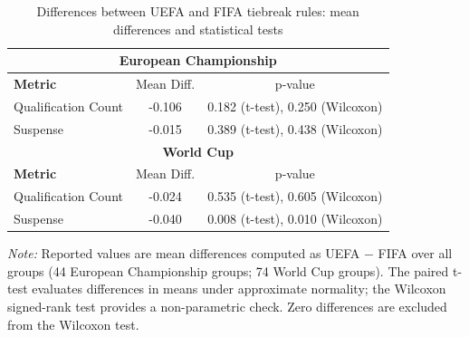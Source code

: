 \begin{table}[H]
\centering
\small
\caption{Differences between UEFA and FIFA tiebreak rules: mean differences and statistical tests}
\label{tab:tests_diff}
\begin{threeparttable}
\begin{tabular}{lcc}
\toprule
\multicolumn{3}{c}{\textbf{European Championship}} \\
\midrule
\textbf{Metric} & Mean Diff. & p-value \\
\midrule
Qualification Count & -0.106 & 0.182 (t-test), 0.250 (Wilcoxon) \\
Suspense            & -0.015 & 0.389 (t-test), 0.438 (Wilcoxon) \\
\midrule
\multicolumn{3}{c}{\textbf{World Cup}} \\
\midrule
\textbf{Metric} & Mean Diff. & p-value \\
\midrule
Qualification Count & -0.024 & 0.535 (t-test), 0.605 (Wilcoxon) \\
Suspense            & -0.040 & 0.008 (t-test), 0.010 (Wilcoxon) \\
\bottomrule
\end{tabular}
\begin{tablenotes}[flushleft]
\small
\textit{Note:} Reported values are mean differences computed as UEFA $-$ FIFA over all groups
(44 European Championship groups; 74 World Cup groups). The paired t-test evaluates
differences in means under approximate normality; the Wilcoxon signed-rank test provides
a non-parametric check. Zero differences are excluded from the Wilcoxon test.
\end{tablenotes}
\end{threeparttable}
\end{table}
